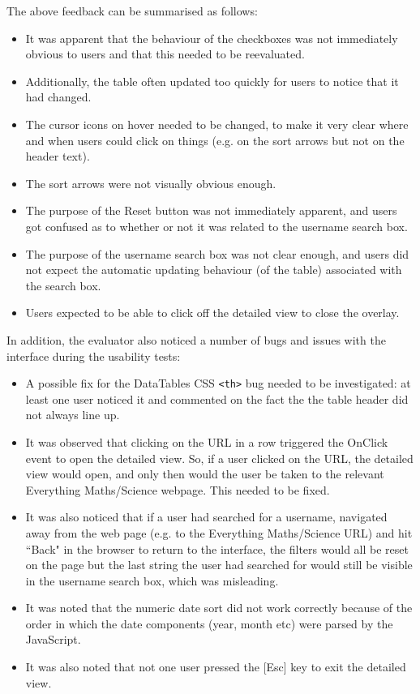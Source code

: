 The above feedback can be summarised as follows:
\begin{itemize}
\item It was apparent that the behaviour of the checkboxes was not immediately obvious to users and that this needed to be reevaluated. 
\item Additionally, the table often updated too quickly for users to notice that it had changed. 
\item The cursor icons on hover needed to be changed, to make it very clear where and when users could click on things (e.g. on the sort arrows but not on the header text). 
\item The sort arrows were not visually obvious enough.
\item The purpose of the Reset button was not immediately apparent, and users got confused as to whether or not it was related to the username search box. 
\item The purpose of the username search box was not clear enough, and users did not expect the automatic updating behaviour (of the table) associated with the search box. 
\item Users expected to be able to click off the detailed view to close the overlay. 
\end{itemize}
In addition, the evaluator also noticed a number of bugs and issues with the interface during the usability tests:
\begin{itemize}
\item A possible fix for the DataTables CSS \verb|<th>| bug needed to be investigated: at least one user noticed it and commented on the fact the the table header did not always line up.
 \item It was observed that clicking on the URL in a row triggered the OnClick event to open the detailed view. So, if a user clicked on the URL, the detailed view would open, and only then would the user be taken to the relevant Everything Maths/Science webpage. This needed to be fixed. 
\item It was also noticed that if a user had searched for a username, navigated away from the web page (e.g. to the Everything Maths/Science URL) and hit ``Back" in the browser to return to the interface, the filters would all be reset on the page but the last string the user had searched for would still be visible in the username search box, which was misleading. 
\item It was noted that the numeric date sort did not work correctly because of the order in which the date components (year, month etc) were parsed by the JavaScript. 
\item It was also noted that not one user pressed the [Esc] key to exit the detailed view. 
\end{itemize}